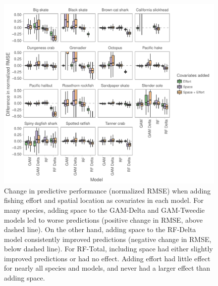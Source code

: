 \documentclass[]{article}
\begin{document}
\begin{figure}

{\centering \includegraphics[width=7in]{bycatch_sim_paper_files/figure-latex/covariate-effects-1} 

}

\caption{Change in predictive performance (normalized RMSE) when adding fishing effort and spatial location as covariates in each model. For many species, adding space to the GAM-Delta and GAM-Tweedie models led to worse predictions (positive change in RMSE, above dashed line). On the other hand, adding space to the RF-Delta model consistently improved predictions (negative change in RMSE, below dashed line). For RF-Total, including space had either slightly improved predictions or had no effect. Adding effort had little effect for nearly all species and models, and never had a larger effect than adding space.}\label{fig:covariate-effects}
\end{figure}

\pagebreak
\end{document}
